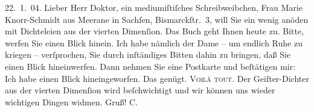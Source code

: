 \pstart
           \raggedleft{}22. 1. 04.\pend
           \vspace{0.5em}
\pstart
           Lieber Herr Doktor, ein mediumiſtiſches Schreibweibchen, Frau Marie Knorr-Schmidt aus Meerane in Sachſen, Bismarckſtr. 3, will Sie ein wenig anöden mit
               Dichteleien aus der vierten Dimenſion. Das Buch geht Ihnen heute zu. Bitte, werfen Sie einen Blick
               hinein. Ich habe nämlich der Dame – um endlich Ruhe zu kriegen – verſprochen, Sie
               durch inſtändiges Bitten dahin zu bringen, daß Sie einen Blick hineinwerfen. Dann
               nehmen Sie eine Postkarte und beſtätigen mir: Ich habe einen Blick hineingeworfen.
               Das genügt. \textsc{Voilà tout}. Der Geiſter-Dichter aus der vierten
               Dimenſion wird beſchwichtigt und wir können uns wieder wichtigen Dingen widmen. Gruß!
                  \spacefill\mbox{C.}\pend
           \endnumbering{}  
      